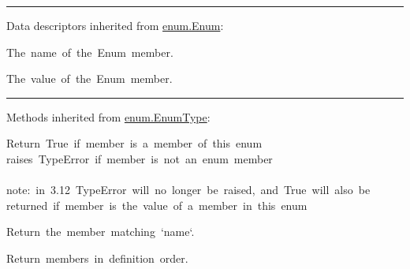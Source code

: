 \begin{longtable}[]
\begin{minipage}[t]{\linewidth}
\begin{longtable}[]
\begin{minipage}[t]{\linewidth}
\begin{center}\rule{0.5\linewidth}{0.5pt}\end{center}

Data descriptors inherited from \href{enum.html\#Enum}{enum.Enum}:\\

\begin{description}
\tightlist
\item[\textbf{name}]
{The~name~of~the~Enum~member.}
\end{description}

\begin{description}
\tightlist
\item[\textbf{value}]
{The~value~of~the~Enum~member.}
\end{description}

\begin{center}\rule{0.5\linewidth}{0.5pt}\end{center}

Methods inherited from \href{enum.html\#EnumType}{enum.EnumType}:\\

\begin{description}
\tightlist
\item[\protect\hypertarget{shotType-__contains__}{}{\textbf{\_\_contains\_\_}}(member){{
from \href{enum.html\#EnumType}{enum.EnumType}}}]
{Return~True~if~member~is~a~member~of~this~enum\\
raises~TypeError~if~member~is~not~an~enum~member\\
\hspace*{0.333em}\\
note:~in~3.12~TypeError~will~no~longer~be~raised,~and~True~will~also~be\\
returned~if~member~is~the~value~of~a~member~in~this~enum}
\end{description}

\begin{description}
\tightlist
\item[\protect\hypertarget{shotType-__getitem__}{}{\textbf{\_\_getitem\_\_}}(name){{
from \href{enum.html\#EnumType}{enum.EnumType}}}]
{Return~the~member~matching~`name`.}
\end{description}

\begin{description}
\tightlist
\item[\protect\hypertarget{shotType-__iter__}{}{\textbf{\_\_iter\_\_}}(){{
from \href{enum.html\#EnumType}{enum.EnumType}}}]
{Return~members~in~definition~order.}
\end{description}


\end{minipage}
\end{longtable}
\end{minipage}
\end{longtable}
